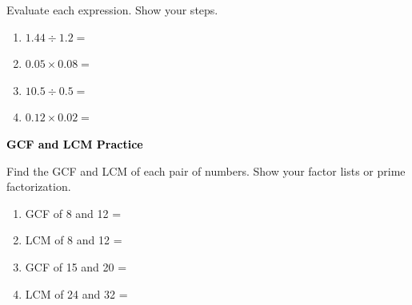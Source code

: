 \documentclass[12pt, letterpaper, fleqn]{article}
\newcommand{\blank}{\underline{\hspace{2.2cm}}}
\begin{document}
\noindent
Evaluate each expression. Show your steps.

\vspace{3mm}
\begin{enumerate}[itemsep=2.2cm, leftmargin=0.6cm]
\item $1.44 \div 1.2 = $ \blank

\vspace{1.8cm}

\item $0.05 \times 0.08 = $ \blank

\vspace{1.8cm}

\item $10.5 \div 0.5 = $ \blank

\vspace{1.8cm}

\item $0.12 \times 0.02 = $ \blank

\vspace{1.8cm}

\end{enumerate}

\newpage

\begin{tcolorbox}[colback=black!10]
\large\textcolor{black}{\textbf{GCF and LCM Practice}}
\end{tcolorbox}

\noindent
Find the GCF and LCM of each pair of numbers. Show your factor lists or prime factorization.

\vspace{3mm}
\begin{enumerate}[itemsep=2.2cm, leftmargin=0.6cm]
\item GCF of 8 and 12 = \blank

\vspace{2cm}

\item LCM of 8 and 12 = \blank

\vspace{2cm}

\item GCF of 15 and 20 = \blank

\vspace{2cm}

\item LCM of 24 and 32 = \blank

\vspace{2cm}

\end{enumerate}
\end{document}
